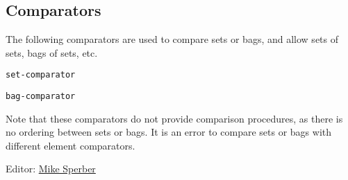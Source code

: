 \subsection{Comparators}


The following comparators are used to compare sets or bags, and allow
sets of sets, bags of sets, etc.

\texttt{set-comparator}

\texttt{bag-comparator}

Note that these comparators do not provide comparison procedures, as
there is no ordering between sets or bags. It is an error to compare
sets or bags with different element comparators.


Editor:
\href{mailto:srfi-editors\%20at\%20srfi\%20dot\%20schemers\%20dot\%20org}{Mike
Sperber}
